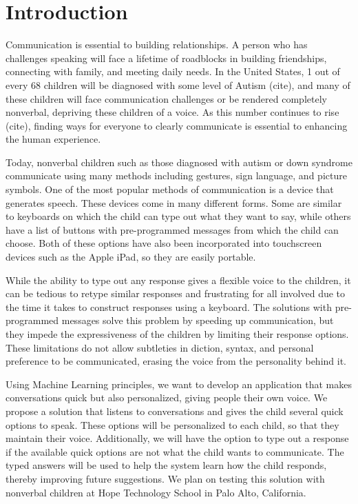 \chapter{Introduction}

Communication is essential to building relationships. A person who has challenges speaking will face a lifetime of roadblocks in building friendships, connecting with family, and meeting daily needs. In the United States, 1 out of every 68 children will be diagnosed with some level of Autism (cite), and many of these children will face communication challenges or be rendered completely nonverbal, depriving these children of a voice. As this number continues to rise (cite), finding ways for everyone to clearly communicate is essential to enhancing the human experience.

Today, nonverbal children such as those diagnosed with autism or down syndrome communicate using many methods including gestures, sign language, and picture symbols. One of the most popular methods of communication is a device that generates speech. These devices come in many different forms. Some are similar to keyboards on which the child can type out what they want to say, while others have a list of buttons with pre-programmed messages from which the child can choose. Both of these options have also been incorporated into touchscreen devices such as the Apple iPad, so they are easily portable. 

While the ability to type out any response gives a flexible voice to the children, it can be tedious to retype similar responses and frustrating for all involved due to the time it takes to construct responses using a keyboard. The solutions with pre-programmed messages solve this problem by speeding up communication, but they impede the expressiveness of the children by limiting their response options. These limitations do not allow subtleties in diction, syntax, and personal preference to be communicated, erasing the voice from the personality behind it.

Using Machine Learning principles, we want to develop an application that makes conversations quick but also personalized, giving people their own voice. We propose a solution that listens to conversations and gives the child several quick options to speak. These options will be personalized to each child, so that they maintain their voice. Additionally, we will have the option to type out a response if the available quick options are not what the child wants to communicate. The typed answers will be used to help the system learn how the child responds, thereby improving future suggestions. We plan on testing this solution with nonverbal children at Hope Technology School in Palo Alto, California.


